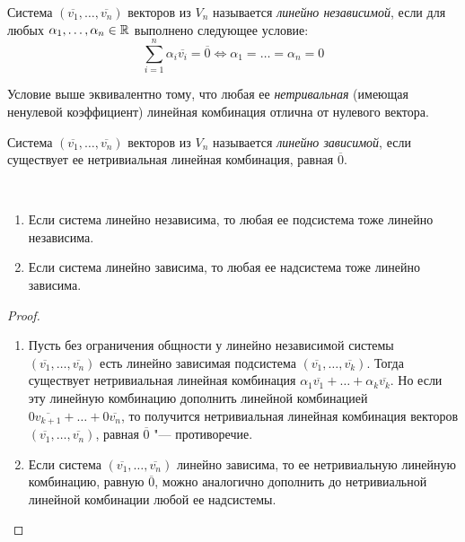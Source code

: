 \begin{definition}
	Система $(\overline{v_1}, \dots, \overline{v_n})$ векторов из $V_n$ называется \textit{линейно независимой}, если для любых $\alpha_1, \dotsc, \alpha_n \in \mathbb{R}$ выполнено следующее условие:
	\[\sum_{i = 1}^{n}\alpha_i\overline{v_i} = \overline{0} \Leftrightarrow \alpha_1 = \dots = \alpha_n = 0\]
\end{definition}

\begin{note}
	Условие выше эквивалентно тому, что любая ее \textit{нетривальная} (имеющая ненулевой коэффициент) линейная комбинация отлична от нулевого вектора.
\end{note}

\begin{definition}
	Система $(\overline{v_1}, \dots, \overline{v_n})$ векторов из $V_n$ называется \textit{линейно зависимой}, если существует ее нетривиальная линейная комбинация, равная $\overline{0}$.
\end{definition}

\begin{proposition}~
	\begin{enumerate}
		\item Если система линейно независима, то любая ее подсистема тоже линейно независима.
		\item Если система линейно зависима, то любая ее надсистема тоже линейно зависима.
	\end{enumerate}
\end{proposition}

\begin{proof}~
	\begin{enumerate}
		\item Пусть без ограничения общности у линейно независимой системы $(\overline{v_1}, \dots, \overline{v_n})$ есть линейно зависимая подсистема $(\overline{v_1}, \dots, \overline{v_k})$. Тогда существует нетривиальная линейная комбинация $\alpha_1\overline{v_1} + \dots + \alpha_k\overline{v_k}$. Но если эту линейную комбинацию дополнить линейной комбинацией $0\overline{v_{k+1}} + \dots + 0\overline{v_n}$, то получится нетривиальная линейная комбинация векторов $(\overline{v_1}, \dots, \overline{v_n})$, равная $\overline{0}$ "--- противоречие.
		
		\item Если система $(\overline{v_1}, \dots, \overline{v_n})$ линейно зависима, то ее нетривиальную линейную комбинацию, равную $\overline{0}$, можно аналогично дополнить до нетривиальной линейной комбинации любой ее надсистемы.\qedhere
	\end{enumerate}
\end{proof}

